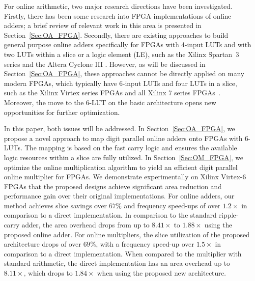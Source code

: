 \documentclass[conference]{IEEEtran}
\begin{document}
For online arithmetic, two major research directions have been investigated. Firstly, there has been some research into FPGA implementations of online adders; a brief review of relevant work in this area is presented in Section~\ref{Sec:OA_FPGA}. Secondly, there are existing approaches to build general purpose online adders specifically for FPGAs with 4-input LUTs and with two LUTs within a slice or a logic element (LE), such as the Xilinx Spartan~3 series \cite{XilinxSpartan} and the Altera Cyclone III \cite{AlteraCyclone}. However, as will be discussed in Section~\ref{Sec:OA_FPGA}, these approaches cannot be directly applied on many modern FPGAs, which typically have 6-input LUTs and four LUTs in a slice, such as the Xilinx Virtex series FPGAs and all Xilinx 7 series FPGAs~\cite{Virtex7}. Moreover, the move to the 6-LUT on the basic architecture opens new opportunities for further optimization.\vspace{-0.5ex}

In this paper, both issues will be addressed. In Section~\ref{Sec:OA_FPGA}, we propose a novel approach to map digit parallel online adders onto FPGAs with 6-LUTs. The mapping is based on the fast carry logic and ensures the available logic resources within a slice are fully utilized. In Section~\ref{Sec:OM_FPGA}, we optimize the online multiplication algorithm to yield an efficient digit parallel online multiplier for FPGAs. We demonstrate experimentally on Xilinx Virtex-6 FPGAs that the proposed designs achieve significant area reduction and performance gain over their original implementations. For online adders, our method achieves  slice savings over $67\%$ and  frequency speed-ups of over $1.2\times$ in comparison to a direct implementation. In comparison to the standard ripple-carry adder, the area overhead drops from up to $8.41\times$ to $1.88\times$ using the proposed online adder. For online multipliers, the slice utilization of the proposed architecture drops of over $69\%$, with a frequency speed-up over $1.5\times$ in comparison to a direct implementation. When compared to the multiplier with standard arithmetic, the direct implementation has an area overhead up to $8.11\times$, which drops to $1.84\times$ when using the proposed new architecture.\vspace{-0.5ex}
\end{document}
